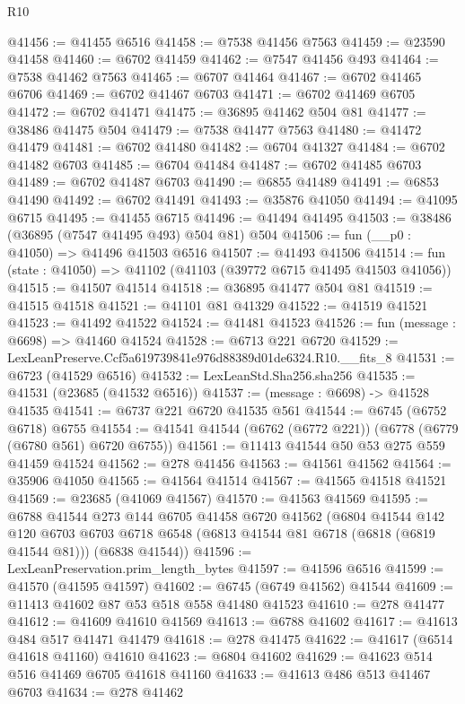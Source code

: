 \begin{lexlean}{R10}
\begin{coremodule}
@41456 := @41455 @6516
@41458 := @7538 @41456 @7563
@41459 := @23590 @41458
@41460 := @6702 @41459
@41462 := @7547 @41456 @493
@41464 := @7538 @41462 @7563
@41465 := @6707 @41464
@41467 := @6702 @41465 @6706
@41469 := @6702 @41467 @6703
@41471 := @6702 @41469 @6705
@41472 := @6702 @41471
@41475 := @36895 @41462 @504 @81
@41477 := @38486 @41475 @504
@41479 := @7538 @41477 @7563
@41480 := @41472 @41479
@41481 := @6702 @41480
@41482 := @6704 @41327
@41484 := @6702 @41482 @6703
@41485 := @6704 @41484
@41487 := @6702 @41485 @6703
@41489 := @6702 @41487 @6703
@41490 := @6855 @41489
@41491 := @6853 @41490
@41492 := @6702 @41491
@41493 := @35876 @41050
@41494 := @41095 @6715
@41495 := @41455 @6715
@41496 := @41494 @41495
@41503 := @38486 (@36895 (@7547 @41495 @493) @504 @81) @504
@41506 := fun (__p0 : @41050) => @41496 @41503 @6516
@41507 := @41493 @41506
@41514 := fun (state : @41050) => @41102 (@41103 (@39772 @6715 @41495 @41503 @41056))
@41515 := @41507 @41514
@41518 := @36895 @41477 @504 @81
@41519 := @41515 @41518
@41521 := @41101 @81 @41329
@41522 := @41519 @41521
@41523 := @41492 @41522
@41524 := @41481 @41523
@41526 := fun (message : @6698) => @41460 @41524
@41528 := @6713 @221 @6720
@41529 := LexLeanPreserve.Ccf5a619739841e976d88389d01de6324.R10.__fits_8
@41531 := @6723 (@41529 @6516)
@41532 := LexLeanStd.Sha256.sha256
@41535 := @41531 (@23685 (@41532 @6516))
@41537 := (message : @6698) -> @41528 @41535
@41541 := @6737 @221 @6720 @41535 @561
@41544 := @6745 (@6752 @6718) @6755
@41554 := @41541 @41544 (@6762 (@6772 @221)) (@6778 (@6779 (@6780 @561) @6720 @6755))
@41561 := @11413 @41544 @50 @53 @275 @559 @41459 @41524
@41562 := @278 @41456
@41563 := @41561 @41562
@41564 := @35906 @41050
@41565 := @41564 @41514
@41567 := @41565 @41518 @41521
@41569 := @23685 (@41069 @41567)
@41570 := @41563 @41569
@41595 := @6788
    @41544
    @273
    @144
    @6705
    @41458
    @6720
    @41562
    (@6804
      @41544
      @142
      @120
      @6703
      @6703
      @6718
      @6548
      (@6813 @41544 @81 @6718 (@6818 (@6819 @41544 @81)))
      (@6838 @41544))
@41596 := LexLeanPreservation.prim_length_bytes
@41597 := @41596 @6516
@41599 := @41570 (@41595 @41597)
@41602 := @6745 (@6749 @41562) @41544
@41609 := @11413 @41602 @87 @53 @518 @558 @41480 @41523
@41610 := @278 @41477
@41612 := @41609 @41610 @41569
@41613 := @6788 @41602
@41617 := @41613 @484 @517 @41471 @41479
@41618 := @278 @41475
@41622 := @41617 (@6514 @41618 @41160) @41610
@41623 := @6804 @41602
@41629 := @41623 @514 @516 @41469 @6705 @41618 @41160
@41633 := @41613 @486 @513 @41467 @6703
@41634 := @278 @41462

\end{coremodule}
\end{lexlean}

